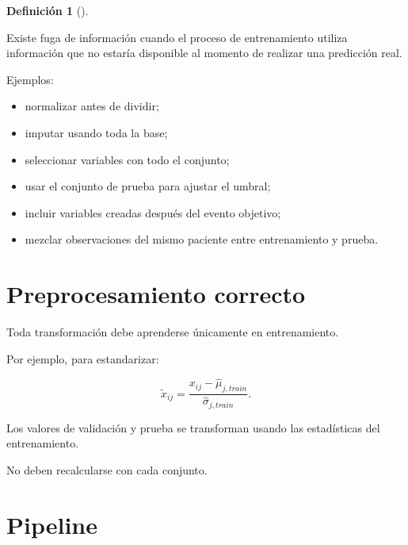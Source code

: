 \documentclass[
  spanish,
  10.5pt,
  letterpaper,
  DIV=11,
  numbers=noendperiod,
  oneside,
  open=any]{scrreprt}
\providecommand{\tightlist}{%
  \setlength{\itemsep}{0pt}\setlength{\parskip}{0pt}}
\theoremstyle{definition}
\newtheorem{definition}{Definición}[chapter]
\theoremstyle{definition}
\theoremstyle{plain}
\theoremstyle{remark}
\begin{document}

\begin{definition}[]\protect\hypertarget{def-fuga-informacion}{}\label{def-fuga-informacion}

Existe fuga de información cuando el proceso de entrenamiento utiliza
información que no estaría disponible al momento de realizar una
predicción real.

\end{definition}

Ejemplos:

\begin{itemize}
\tightlist
\item
  normalizar antes de dividir;
\item
  imputar usando toda la base;
\item
  seleccionar variables con todo el conjunto;
\item
  usar el conjunto de prueba para ajustar el umbral;
\item
  incluir variables creadas después del evento objetivo;
\item
  mezclar observaciones del mismo paciente entre entrenamiento y prueba.
\end{itemize}

\section*{Preprocesamiento correcto}\label{preprocesamiento-correcto}


Toda transformación debe aprenderse únicamente en entrenamiento.

Por ejemplo, para estandarizar:

\[
\widetilde{x}_{ij}
=
\frac{
x_{ij}-\widehat{\mu}_{j,train}
}{
\widehat{\sigma}_{j,train}
}.
\]

Los valores de validación y prueba se transforman usando las
estadísticas del entrenamiento.

No deben recalcularse con cada conjunto.

\section*{Pipeline}\label{pipeline}

\end{document}
